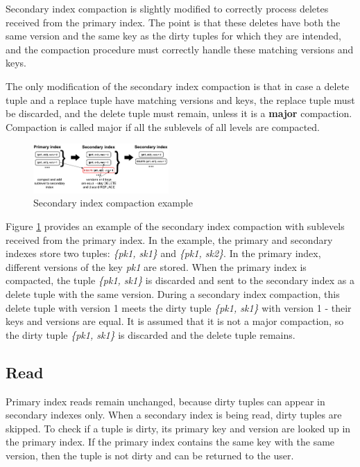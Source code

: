 \documentclass{vldb}
\begin{document}
Secondary index compaction is slightly modified to correctly process deletes received
from the primary index. The point is that these deletes have both the same version and
the same key as the dirty tuples for which they are intended, and the compaction
procedure must correctly handle these matching versions and keys.

The only modification of the secondary index compaction is that in case 
a delete tuple and a replace tuple have matching versions and keys, the replace
tuple must be discarded, and the delete tuple must remain, unless it is a \textbf{major}
compaction. Compaction is called major if all the sublevels of all levels are compacted.
\begin{figure}
\centering
\includegraphics[width=0.46\textwidth]{secondary_compaction_example}
\caption{Secondary index compaction example}
\label{fig:secondary_compaction_example}
\end{figure}
Figure \ref{fig:secondary_compaction_example} provides an example of
the secondary index compaction with sublevels received from the primary index.
In the example, the primary and secondary indexes store two tuples:
\textit{\{pk1, sk1\}} and \textit{\{pk1, sk2\}}. In the primary index, different
versions of the key \textit{pk1} are stored. When the primary index is compacted,
the tuple \textit{\{pk1, sk1\}} is discarded and sent to the secondary index as a
delete tuple with the same version. During a secondary index compaction, this
delete tuple with version 1 meets the dirty tuple \textit{\{pk1, sk1\}} with
version 1 - their keys and versions are equal. It is assumed that it is not a major
compaction, so the dirty tuple \textit{\{pk1, sk1\}} is discarded and the delete
tuple remains.

\subsection{Read}

Primary index reads remain unchanged, because dirty tuples can appear in
secondary indexes only. When a secondary index is being read, dirty tuples are
skipped. To check if a tuple is dirty, its primary key and version are looked
up in the primary index. If the primary index contains the same key with the same
version, then the tuple is not dirty and can be returned to the user.
\end{document}
